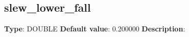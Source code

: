 \subsection*{slew_lower_fall}
\textbf{Type}: DOUBLE\newline
\textbf{Default value}: 0.200000\newline
\textbf{Description}: